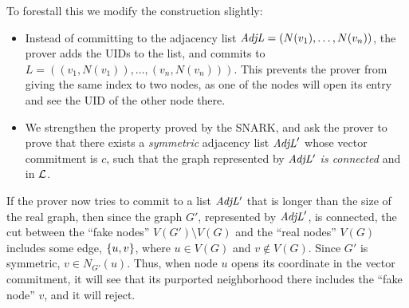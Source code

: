 To forestall this we modify the construction slightly:
\begin{itemize}
	\item Instead of committing to the adjacency list $\mathit{ AdjL } = (N(v_1),\ldots,N(v_n))$,
the prover adds the UIDs to the list, and commits to $L = ( (v_1, N(v_1)), \ldots, (v_n, N(v_n)))$.
This prevents the prover from giving the same index to two nodes, as one of the nodes will open 
its entry and see the UID of the other node there.
\item 
We strengthen the property proved by the SNARK,
and ask the prover to prove that there exists a \emph{symmetric} adjacency list $\mathit{ AdjL }'$
whose vector commitment is $c$,
such that the graph represented by $\mathit{ AdjL' }$ \emph{is connected} and in $\mathcal{L}$.
	\end{itemize}
%
If the prover now tries to commit to a list $\mathit{ AdjL' }$ that is longer than the size of the real graph, then since the graph $G'$, represented by $\mathit{ AdjL }'$, is connected, the cut between the ``fake nodes'' $V(G') \setminus V(G)$ and the ``real nodes'' $V(G)$ includes some edge, $\left \{{u,v} \right \}$, where $u \in V(G)$ and $v \not \in V(G)$. Since $G'$ is symmetric, $v \in N_{G'}(u)$. Thus, when node $u$ opens its coordinate in the vector commitment, it will see that its purported neighborhood there includes the ``fake node'' $v$, and it will reject.

